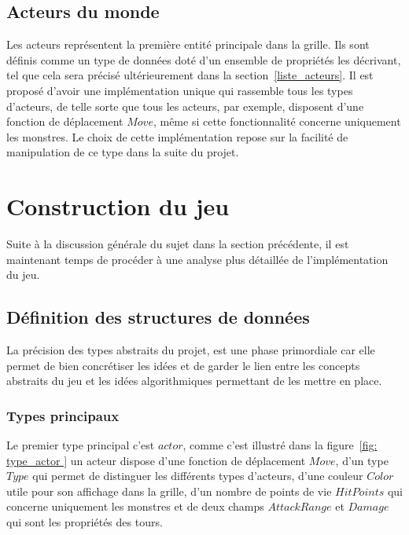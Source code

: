 \documentclass[11pt]{article}
\begin{document}
        \subsection{Acteurs du monde}
            Les acteurs représentent la première entité principale dans la grille. Ils sont définis comme un type de données doté d'un ensemble de propriétés les décrivant, tel que cela sera précisé ultérieurement dans la section~\ref{liste_acteurs}. Il est proposé d'avoir une implémentation unique qui rassemble tous les types d'acteurs, de telle sorte que tous les acteurs, par exemple, disposent d'une fonction de déplacement $Move$, même si cette fonctionnalité concerne uniquement les monstres. Le choix de cette implémentation repose sur la facilité de manipulation de ce type dans la suite du projet.
    \section{Construction du jeu}
    Suite à la discussion générale du sujet dans la section précédente, il est maintenant temps de procéder à une analyse plus détaillée de l'implémentation du jeu.
        \subsection{Définition des structures de données}
            La précision des types abstraits du projet, est une phase primordiale car elle permet de bien concrétiser les idées et de garder le lien entre les concepts abstraits du jeu et les idées algorithmiques permettant de les mettre en place.
            \subsubsection{Types principaux}
            Le premier type principal c'est $actor$, comme c'est illustré dans la figure~\ref{fig: type_actor } un acteur dispose d'une fonction de déplacement $Move$, d'un type $Type$ qui permet de distinguer les différents types d'acteurs, d'une couleur $Color$ utile pour son affichage dans la grille, d'un nombre de points de vie $HitPoints$ qui concerne uniquement les monstres et de deux champs $AttackRange$ et $Damage$ qui sont les propriétés des tours.
\end{document}
